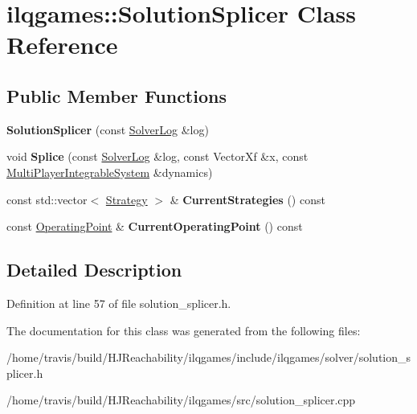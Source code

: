 \hypertarget{classilqgames_1_1_solution_splicer}{}\section{ilqgames\+:\+:Solution\+Splicer Class Reference}
\label{classilqgames_1_1_solution_splicer}
\subsection*{Public Member Functions}
\begin{DoxyCompactItemize}
\item 
{\bfseries Solution\+Splicer} (const \hyperlink{classilqgames_1_1_solver_log}{Solver\+Log} \&log)\hypertarget{classilqgames_1_1_solution_splicer_add264f103d0c16f989549ba4d030d13e}{}\label{classilqgames_1_1_solution_splicer_add264f103d0c16f989549ba4d030d13e}

\item 
void {\bfseries Splice} (const \hyperlink{classilqgames_1_1_solver_log}{Solver\+Log} \&log, const Vector\+Xf \&x, const \hyperlink{classilqgames_1_1_multi_player_integrable_system}{Multi\+Player\+Integrable\+System} \&dynamics)\hypertarget{classilqgames_1_1_solution_splicer_a124e8a060f775e8092c3b277e4f00229}{}\label{classilqgames_1_1_solution_splicer_a124e8a060f775e8092c3b277e4f00229}

\item 
const std\+::vector$<$ \hyperlink{structilqgames_1_1_strategy}{Strategy} $>$ \& {\bfseries Current\+Strategies} () const \hypertarget{classilqgames_1_1_solution_splicer_ab513525045570c0156ce8855fbe49871}{}\label{classilqgames_1_1_solution_splicer_ab513525045570c0156ce8855fbe49871}

\item 
const \hyperlink{structilqgames_1_1_operating_point}{Operating\+Point} \& {\bfseries Current\+Operating\+Point} () const \hypertarget{classilqgames_1_1_solution_splicer_aa9986a86a6dead3dbe781c6dfa5d6745}{}\label{classilqgames_1_1_solution_splicer_aa9986a86a6dead3dbe781c6dfa5d6745}

\end{DoxyCompactItemize}


\subsection{Detailed Description}


Definition at line 57 of file solution\+\_\+splicer.\+h.



The documentation for this class was generated from the following files\+:\begin{DoxyCompactItemize}
\item 
/home/travis/build/\+H\+J\+Reachability/ilqgames/include/ilqgames/solver/solution\+\_\+splicer.\+h\item 
/home/travis/build/\+H\+J\+Reachability/ilqgames/src/solution\+\_\+splicer.\+cpp\end{DoxyCompactItemize}
